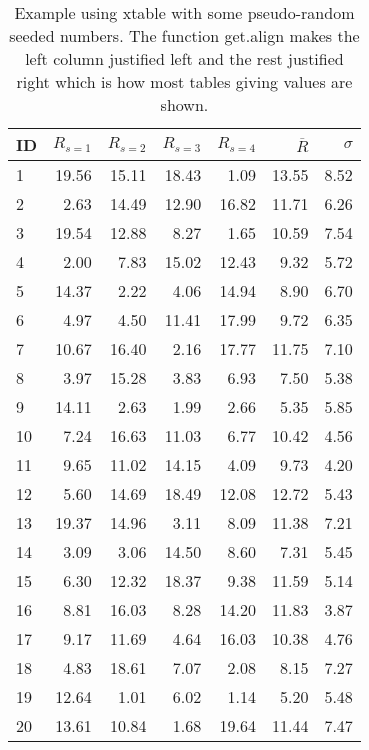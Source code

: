 \documentclass[11pt]{book}\usepackage[]{graphicx}\usepackage[]{color}
\begin{document}
 

\begin{table}[ht]
\centering
\caption{Example using xtable with some pseudo-random seeded numbers. The function get.align makes the left column justified left and the rest justified right which is how most tables giving values are shown.} 
\label{tab:example-xtable}
\begin{tabular}{lrrrrrr}
  \hline
\textbf{ID} & $R_{s=1}$ & $R_{s=2}$ & $R_{s=3}$ & $R_{s=4}$ & $\overline{R}$ & $\sigma$ \\ 
  \hline
  1 & 19.56 & 15.11 & 18.43 & 1.09 & 13.55 & 8.52 \\ 
    2 & 2.63 & 14.49 & 12.90 & 16.82 & 11.71 & 6.26 \\ 
    3 & 19.54 & 12.88 & 8.27 & 1.65 & 10.59 & 7.54 \\ 
    4 & 2.00 & 7.83 & 15.02 & 12.43 & 9.32 & 5.72 \\ 
    5 & 14.37 & 2.22 & 4.06 & 14.94 & 8.90 & 6.70 \\ 
    6 & 4.97 & 4.50 & 11.41 & 17.99 & 9.72 & 6.35 \\ 
    7 & 10.67 & 16.40 & 2.16 & 17.77 & 11.75 & 7.10 \\ 
    8 & 3.97 & 15.28 & 3.83 & 6.93 & 7.50 & 5.38 \\ 
    9 & 14.11 & 2.63 & 1.99 & 2.66 & 5.35 & 5.85 \\ 
   10 & 7.24 & 16.63 & 11.03 & 6.77 & 10.42 & 4.56 \\ 
   11 & 9.65 & 11.02 & 14.15 & 4.09 & 9.73 & 4.20 \\ 
   12 & 5.60 & 14.69 & 18.49 & 12.08 & 12.72 & 5.43 \\ 
   13 & 19.37 & 14.96 & 3.11 & 8.09 & 11.38 & 7.21 \\ 
   14 & 3.09 & 3.06 & 14.50 & 8.60 & 7.31 & 5.45 \\ 
   15 & 6.30 & 12.32 & 18.37 & 9.38 & 11.59 & 5.14 \\ 
   16 & 8.81 & 16.03 & 8.28 & 14.20 & 11.83 & 3.87 \\ 
   17 & 9.17 & 11.69 & 4.64 & 16.03 & 10.38 & 4.76 \\ 
   18 & 4.83 & 18.61 & 7.07 & 2.08 & 8.15 & 7.27 \\ 
   19 & 12.64 & 1.01 & 6.02 & 1.14 & 5.20 & 5.48 \\ 
   20 & 13.61 & 10.84 & 1.68 & 19.64 & 11.44 & 7.47 \\ 
   \hline
\end{tabular}
\end{table}
\end{document}
